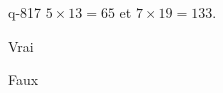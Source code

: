 \begin{truefalse}{q-817}
$5\times 13 = 65$ et $7\times 19 = 133$.
\item* Vrai
\item Faux
\end{truefalse}

